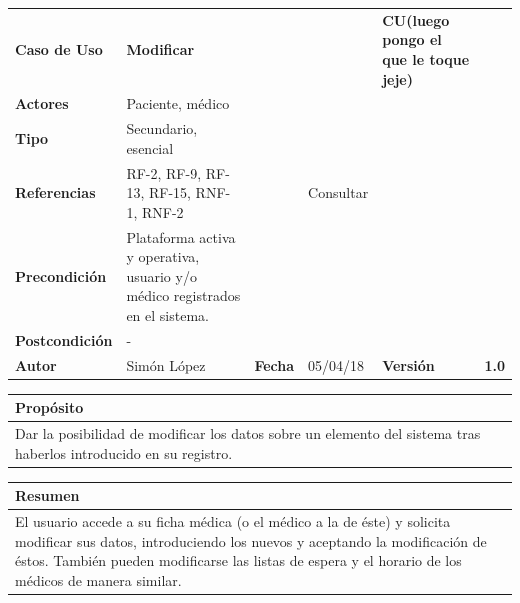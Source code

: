 \documentclass[11pt,a4paper]{article}
\begin{document}

\begin{table}[h]
	\centering
	\begin{tabular}{|l|lllll}
		\cline{1-1} \cline{6-6}
		\textbf{Caso de Uso}   & \textbf{Modificar} &   &  & \multicolumn{1}{l|}{\textbf{\textbf{CU(luego pongo el que le toque jeje)}}}        & \multicolumn{1}{l|}{\textbf{}} \\ \cline{1-1} \cline{6-6} 
		\textbf{Actores}       & Paciente, médico  &                                     &                       &                                       & \textbf{}                      \\ \cline{1-1}
		\textbf{Tipo}          & Secundario, esencial  &                                     &                       &                                       & \textbf{}                      \\ \cline{1-1}
		\textbf{Referencias}   & RF-2, RF-9, RF-13, RF-15, RNF-1, RNF-2 &   & Consultar                       &                                       & \textbf{}                      \\ \cline{1-1}
		\textbf{Precondición}  & Plataforma activa y operativa, usuario y/o médico registrados en el sistema.                          &                      &                & \textbf{}                      \\ \cline{1-1}
		\textbf{Postcondición} & -                     &                                     &                       &                                       &                                \\ \cline{1-1} \cline{3-3} \cline{5-5}
		\textbf{Autor}         & \multicolumn{1}{l|}{Simón López} & \multicolumn{1}{l|}{\textbf{Fecha}} & \multicolumn{1}{l|}{05/04/18} & \multicolumn{1}{l|}{\textbf{Versión}} & \textbf{1.0}                      \\ \cline{1-1} \cline{3-3} \cline{5-5}
	\end{tabular}
\end{table}

\begin{table}[h]
	\centering
	\begin{tabular}{l}
		\hline
		\multicolumn{1}{|l|}{Propósito} \\ \hline
		Dar la posibilidad de modificar los datos sobre un elemento del sistema tras haberlos introducido en su registro.
	\end{tabular}
\end{table}

\begin{table}[h]
	\centering
	\begin{tabular}{l}
		\hline
		\multicolumn{1}{|l|}{Resumen} \\ \hline
		El usuario accede a su ficha médica (o el médico a la de éste) y solicita modificar sus datos, introduciendo los nuevos y aceptando la modificación de éstos. También pueden modificarse las listas de espera y el horario de los médicos de manera similar.
	\end{tabular}
\end{table}
\end{document}
